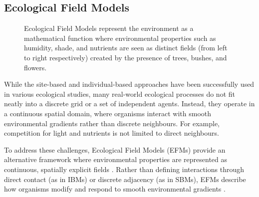 \subsection{Ecological Field Models}

\begin{figure}
    \caption{Ecological Field Models represent the environment as a mathematical function where environmental properties such as humidity, shade, and nutrients are seen as distinct fields (from left to right respectively) created by the presence of trees, bushes, and flowers.}
    \label{fig:env-obj-ecological-field-models}
\end{figure}



While the site-based and individual-based approaches have been successfully used in various ecological studies, many real-world ecological processes do not fit neatly into a discrete grid or a set of independent agents. Instead, they operate in a continuous spatial domain, where organisms interact with smooth environmental gradients rather than discrete neighbours. For example, competition for light and nutrients is not limited to direct neighbours.

To address these challenges, Ecological Field Models (EFMs) provide an alternative framework where environmental properties are represented as continuous, spatially explicit fields \cite{Wu1985}. Rather than defining interactions through direct contact (as in IBMs) or discrete adjacency (as in SBMs), EFMs describe how organisms modify and respond to smooth environmental gradients \cite{Chng2011b,Seidl2012}.


